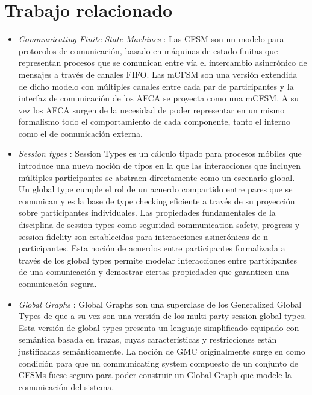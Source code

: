 \section{Trabajo relacionado}
\label{trabajo-relacionado}

\begin{itemize}
\item \emph{Communicating Finite State Machines} \cite{brand:jacm-30_2}: Las CFSM son un modelo para protocolos de comunicación, basado en máquinas de estado finitas que representan procesos que se comunican entre vía el intercambio asincrónico de mensajes a través de canales FIFO. Las mCFSM son una versión extendida de dicho modelo con múltiples canales entre cada par de participantes y la interfaz de comunicación de los AFCA se proyecta como una mCFSM. A su vez los AFCA surgen de la necesidad de poder representar en un mismo formalismo todo el comportamiento de cada componente, tanto el interno como el de comunicación externa.
\item \emph{Session types} \cite{honda:esop98,honda:popl08}: Session Types es un cálculo tipado para procesos móbiles que introduce una nueva noción de tipos en la que las interacciones que incluyen múltiples participantes se abstraen directamente como un escenario global. Un global type cumple el rol de un acuerdo compartido entre pares que se comunican y es la base de type checking eficiente a través de su proyección sobre participantes individuales. Las propiedades fundamentales de la disciplina de session types como seguridad communication safety, progress y session fidelity son establecidas para interacciones asincrónicas de n participantes. Esta noción de acuerdos entre participantes formalizada a través de los global types permite modelar interacciones entre participantes de una comunicación y demostrar ciertas propiedades que garanticen una comunicación segura.
\item \emph{Global Graphs} \cite{castagna:lmcs-8_1}: Global Graphs son una superclase de los Generalized Global Types de \cite{denielou:esop12} que a su vez son una versión de los multi-party session global types. Esta versión de global types presenta un lenguaje simplificado equipado con semántica basada en trazas, cuyas características y restricciones están justificadas semánticamente. La noción de GMC originalmente surge en \cite{lange:popl15} como condición para que un communicating system compuesto de un conjunto de CFSMs fuese seguro para poder construir un Global Graph que modele la comunicación del sistema.  

\end{itemize}
